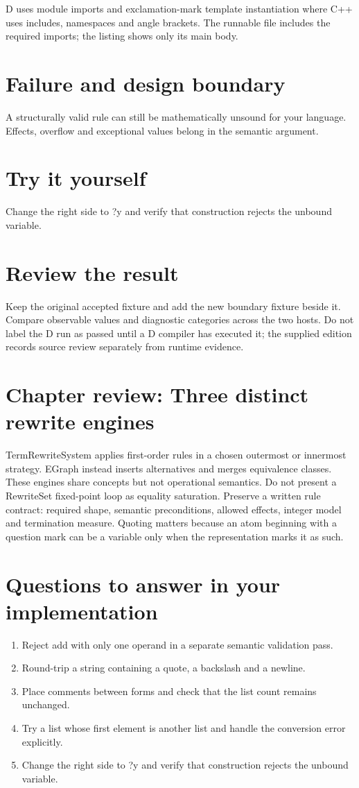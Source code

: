 \clearpage
{}
D uses module imports and exclamation-mark template instantiation where C++ uses includes, namespaces and angle brackets. The runnable file includes the required imports; the listing shows only its main body.


\section*{Failure and design boundary}
A structurally valid rule can still be mathematically unsound for your language. Effects, overflow and exceptional values belong in the semantic argument.

\section*{Try it yourself}
Change the right side to ?y and verify that construction rejects the unbound variable.

\section*{Review the result}
Keep the original accepted fixture and add the new boundary fixture beside it. Compare observable values and diagnostic categories across the two hosts. Do not label the D run as passed until a D compiler has executed it; the supplied edition records source review separately from runtime evidence.

\clearpage
\section*{Chapter review: Three distinct rewrite engines}
TermRewriteSystem applies first-order rules in a chosen outermost or innermost strategy. EGraph instead inserts alternatives and merges equivalence classes. These engines share concepts but not operational semantics. Do not present a RewriteSet fixed-point loop as equality saturation. Preserve a written rule contract: required shape, semantic preconditions, allowed effects, integer model and termination measure. Quoting matters because an atom beginning with a question mark can be a variable only when the representation marks it as such.

\section*{Questions to answer in your implementation}
\begin{enumerate}
\item Reject add with only one operand in a separate semantic validation pass.
\item Round-trip a string containing a quote, a backslash and a newline.
\item Place comments between forms and check that the list count remains unchanged.
\item Try a list whose first element is another list and handle the conversion error explicitly.
\item Change the right side to ?y and verify that construction rejects the unbound variable.
\end{enumerate}
